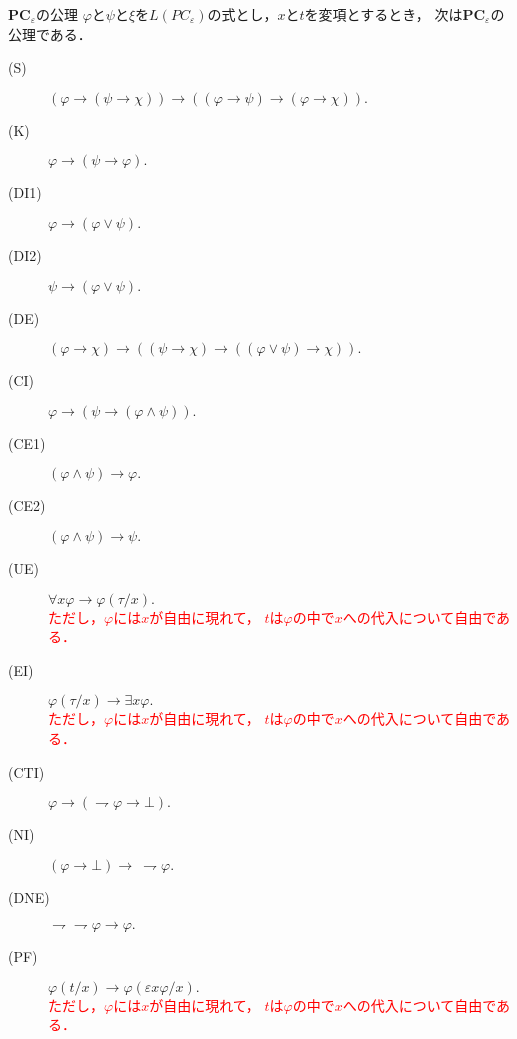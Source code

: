 \begin{description}
	\begin{itembox}[l]{{\bf PC}${}_{\varepsilon}$の公理}
		$\varphi$と$\psi$と$\xi$を$L(PC_{\varepsilon})$の式とし，$x$と$t$を変項とするとき，
		次は{\bf PC}${}_{\varepsilon}$の公理である．
		\begin{description}
			\item[(S)] $(\varphi \rightarrow (\psi \rightarrow \chi)) 
				\rightarrow ((\varphi \rightarrow \psi)
				\rightarrow (\varphi \rightarrow \chi)).$
			\item[(K)] $\varphi \rightarrow (\psi \rightarrow \varphi).$
			\item[(DI1)] $\varphi \rightarrow (\varphi \vee \psi).$
			\item[(DI2)] $\psi \rightarrow (\varphi \vee \psi).$
			\item[(DE)] $(\varphi \rightarrow \chi) \rightarrow 
				((\psi \rightarrow \chi) \rightarrow ((\varphi \vee \psi) \rightarrow \chi)).$
			\item[(CI)] $\varphi \rightarrow (\psi \rightarrow (\varphi \wedge \psi)).$
			\item[(CE1)] $(\varphi \wedge \psi) \rightarrow \varphi.$
			\item[(CE2)] $(\varphi \wedge \psi) \rightarrow \psi.$
			
			\item[(UE)] $\forall x \varphi \rightarrow \varphi(\tau/x).$
				\\ \textcolor{red}{ただし，$\varphi$には$x$が自由に現れて，
				$t$は$\varphi$の中で$x$への代入について自由である．}
				
			\item[(EI)] $\varphi(\tau/x) \rightarrow \exists x \varphi.$
				\\ \textcolor{red}{ただし，$\varphi$には$x$が自由に現れて，
				$t$は$\varphi$の中で$x$への代入について自由である．}
				
			\item[(CTI)] $\varphi \rightarrow (\rightharpoondown \varphi \rightarrow \bot).$
			
			\item[(NI)] $(\varphi \rightarrow \bot) \rightarrow\ \rightharpoondown \varphi.$
			\item[(DNE)] $\rightharpoondown \rightharpoondown \varphi \rightarrow \varphi.$
			\item[(PF)] $\varphi(t/x) \rightarrow \varphi(\varepsilon x \varphi/x).$
				\\ \textcolor{red}{ただし，$\varphi$には$x$が自由に現れて，
				$t$は$\varphi$の中で$x$への代入について自由である．}
		\end{description}
	\end{itembox}
	

\end{description}
